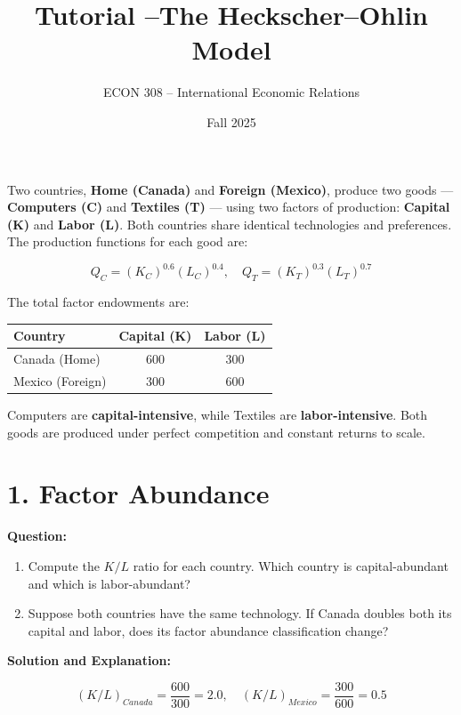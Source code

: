 \documentclass[12pt]{article}
\title{Tutorial  --The Heckscher--Ohlin Model}
\author{ECON 308 -- International Economic Relations}
\date{Fall 2025}
\begin{document}
\maketitle



\noindent
Two countries, \textbf{Home (Canada)} and \textbf{Foreign (Mexico)}, produce two goods — \textbf{Computers (C)} and \textbf{Textiles (T)} — using two factors of production: \textbf{Capital (K)} and \textbf{Labor (L)}.  
Both countries share identical technologies and preferences. The production functions for each good are:

\[
Q_C = (K_C)^{0.6}(L_C)^{0.4}, \quad Q_T = (K_T)^{0.3}(L_T)^{0.7}
\]

\noindent
The total factor endowments are:

\begin{center}
\begin{tabular}{lcc}
\toprule
\textbf{Country} & \textbf{Capital (K)} & \textbf{Labor (L)} \\
\midrule
Canada (Home) & 600 & 300 \\
Mexico (Foreign) & 300 & 600 \\
\bottomrule
\end{tabular}
\end{center}

\noindent
Computers are \textbf{capital-intensive}, while Textiles are \textbf{labor-intensive}.  
Both goods are produced under perfect competition and constant returns to scale.

\section*{1. Factor Abundance}

\noindent\textbf{Question:}
\begin{enumerate}
    \item Compute the \( K/L \) ratio for each country. Which country is capital-abundant and which is labor-abundant?
    \item Suppose both countries have the same technology. If Canada doubles both its capital and labor, does its factor abundance classification change?
\end{enumerate}

\noindent\textbf{Solution and Explanation:}

\[
(K/L)_{Canada} = \frac{600}{300} = 2.0, \quad (K/L)_{Mexico} = \frac{300}{600} = 0.5
\]
\end{document}
